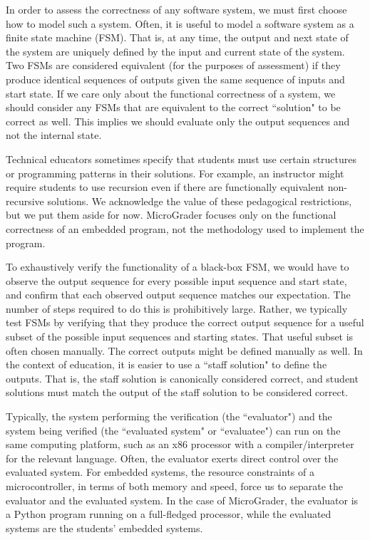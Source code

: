 \documentclass[12pt]{article}
\begin{document}
In order to assess the correctness of any software system, we must first choose how to model such a system.  Often, it is useful to model a software system as a finite state machine (FSM).  That is, at any time, the output and next state of the system are uniquely defined by the input and current state of the system.  Two FSMs are considered equivalent (for the purposes of assessment) if they produce identical sequences of outputs given the same sequence of inputs and start state.  If we care only about the functional correctness of a system, we should consider any FSMs that are equivalent to the correct ``solution" to be correct as well.  This implies we should evaluate only the output sequences and not the internal state.

Technical educators sometimes specify that students must use certain structures or programming patterns in their solutions.  For example, an instructor might require students to use recursion even if there are functionally equivalent non-recursive solutions.  We acknowledge the value of these pedagogical restrictions, but we put them aside for now.  MicroGrader focuses only on the functional correctness of an embedded program, not the methodology used to implement the program.

To exhaustively verify the functionality of a black-box FSM, we would have to observe the output sequence for every possible input sequence and start state, and confirm that each observed output sequence matches our expectation. The number of steps required to do this is prohibitively large.  Rather, we typically test FSMs by verifying that they produce the correct output sequence for a useful subset of the possible input sequences and starting states.  That useful subset is often chosen manually.  The correct outputs might be defined manually as well.  In the context of education, it is easier to use a ``staff solution" to define the outputs.  That is, the staff solution is canonically considered correct, and student solutions must match the output of the staff solution to be considered correct.
   
Typically, the system performing the verification (the ``evaluator") and the system being verified (the ``evaluated system" or ``evaluatee") can run on the same computing platform, such as an x86 processor with a compiler/interpreter for the relevant language.  Often, the evaluator exerts direct control over the evaluated system.  For embedded systems, the resource constraints of a microcontroller, in terms of both memory and speed, force us to separate the evaluator and the evaluated system.  In the case of MicroGrader, the evaluator is a Python program running on a full-fledged processor, while the evaluated systems are the students' embedded systems.
\end{document}
